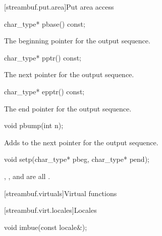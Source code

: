 [streambuf.put.area]{Put area access}

%
\begin{itemdecl}
char_type* pbase() const;
\end{itemdecl}

\begin{itemdescr}
\pnum
\returns
The beginning pointer for the output sequence.
\end{itemdescr}

%
\begin{itemdecl}
char_type* pptr() const;
\end{itemdecl}

\begin{itemdescr}
\pnum
\returns
The next pointer for the output sequence.
\end{itemdescr}

%
\begin{itemdecl}
char_type* epptr() const;
\end{itemdecl}

\begin{itemdescr}
\pnum
\returns
The end pointer for the output sequence.
\end{itemdescr}

%
\begin{itemdecl}
void pbump(int n);
\end{itemdecl}

\begin{itemdescr}
\pnum
\effects
Adds  to the next pointer for the output sequence.
\end{itemdescr}

%
\begin{itemdecl}
void setp(char_type* pbeg, char_type* pend);
\end{itemdecl}

\begin{itemdescr}
\pnum
\ensures
{},
,
and
 are all .
\end{itemdescr}

[streambuf.virtuals]{Virtual functions}

[streambuf.virt.locales]{Locales}

%
\begin{itemdecl}
void imbue(const locale&);
\end{itemdecl}

